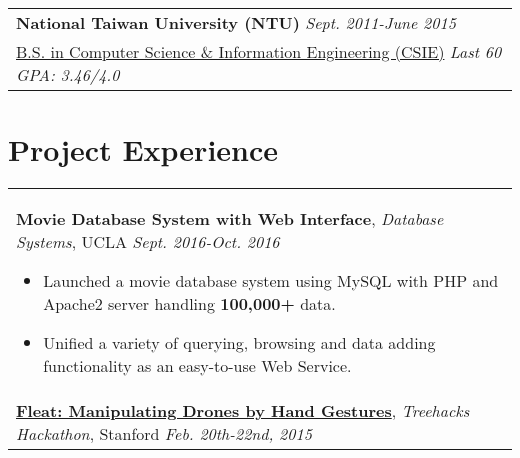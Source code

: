 \documentclass[a4paper,10pt]{article} %
\begin{document}
{\begin{tabular}{p{16cm}}
\vspace{0.5mm}
\textsc \normalsize\textbf{National Taiwan University (NTU)} \hfill  \it{Sept. 2011-June 2015}\\
\href{https://www.csie.ntu.edu.tw}{B.S. in Computer Science \& Information Engineering (CSIE)} 
\hfill \it{Last 60 GPA: 3.46/4.0}\\ 
\end{tabular}


\section{\textbf{Project Experience}}
\begin{tabular}{p{16cm}}

\normalsize\textbf{Movie Database System with Web Interface}, {\it{Database Systems}}, UCLA \hfill {\it Sept. 2016-Oct. 2016}
\vspace{0.5mm}
\begin{itemize}
\item Launched a movie database system using MySQL with PHP and Apache2 server handling \textbf{100,000+} data.
\item Unified a variety of querying, browsing and data adding functionality as an easy-to-use Web Service.\vspace*{-\baselineskip}
\end{itemize} \\
\vspace{0.5mm}

\normalsize\textbf{\href{https://www.youtube.com/watch?v=jxsZaQ6PcXU}{Fleat: Manipulating Drones by Hand Gestures}}, {\it{Treehacks Hackathon}}, Stanford \hfill {\it Feb. 20th-22nd, 2015}


\end{tabular}}
\end{document}
